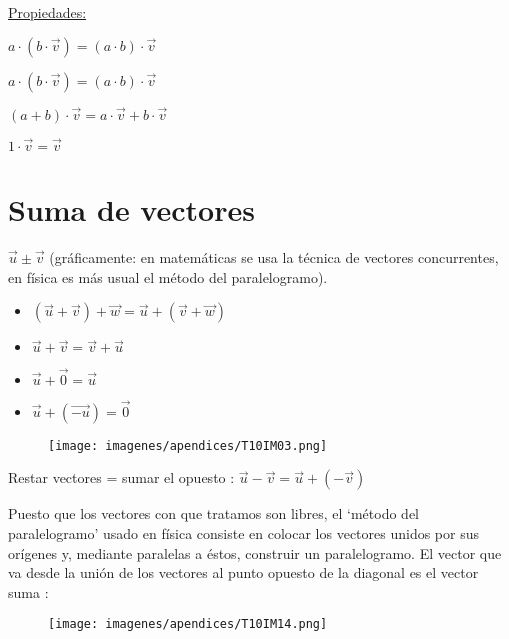 \vspace{4mm}

\underline{Propiedades:} 

\begin{itemize}
\begin{multicols}{2}
	\item $a\cdot (b\cdot \vec v)=(a\cdot b)\cdot \vec v$ 
	\item  $a\cdot (b\cdot \vec v)=(a\cdot b)\cdot \vec v$ 
	\item $(a+b)\cdot \vec v=a\cdot \vec v+ b\cdot \vec v  $
	\item $1\cdot \vec v=\vec v$
\end{multicols}
\end{itemize}

\section{Suma de vectores}

	$\vec u \pm \vec v$  (gráficamente: en matemáticas se usa la técnica de vectores concurrentes, en física es más usual el método del paralelogramo).
	\begin{multicols}{2}
	
	\begin{itemize}
		\item $(\vec u + \vec v)+ \vec w=\vec u+(\vec v + \vec w)$
		\vspace{-2mm}\item $\vec u + \vec v= \vec v+ \vec u$
		\vspace{-2mm}\item $\vec u+ \vec 0=\vec u$
		\vspace{-2mm}\item $\vec u+ (\overrightarrow {-u})=\vec 0$
	\end{itemize}
	\begin{figure}[H]
		\centering
		\texttt{[image: imagenes/apendices/T10IM03.png]}
	\end{figure}
	\end{multicols}
	Restar vectores = sumar el opuesto : $\vec u - \vec v = \vec u +(-\vec v)$

\begin{multicols}{2}
	\scriptsize{Puesto que los vectores con que tratamos son libres, el `método del paralelogramo' usado en física consiste en colocar los vectores unidos por sus orígenes y, mediante paralelas a éstos, construir un paralelogramo. El vector que va desde la unión de los vectores al punto opuesto de la diagonal es el vector suma}  \normalsize{:}

	\begin{figure}[H]
	\centering
	\texttt{[image: imagenes/apendices/T10IM14.png]}
	\end{figure}
\end{multicols}

